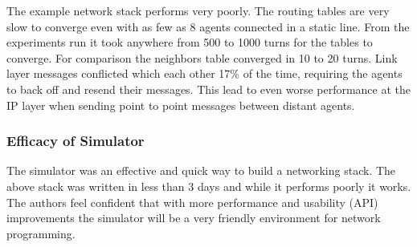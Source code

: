 The example network stack performs very poorly. The routing tables are very slow to converge even
with as few as 8 agents connected in a static line. From the experiments run it took anywhere from
500 to 1000 turns for the tables to converge. For comparison the neighbors table converged in 10 to
20 turns. Link layer messages conflicted which each other 17\% of the time, requiring the agents to
back off and resend their messages. This lead to even worse performance at the IP layer when sending
point to point messages between distant agents.

\subsubsection{Efficacy of Simulator}

The simulator was an effective and quick way to build a networking stack. The above stack was
written in less than 3 days and while it performs poorly it works. The authors feel confident that
with more performance and usability (API) improvements the simulator will be a very friendly
environment for network programming. 

